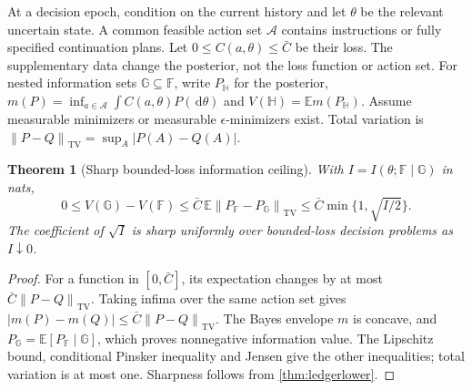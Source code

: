 \documentclass[11pt]{article}
\newcommand{\norm}[1]{\left\lVert #1\right\rVert}
\numberwithin{equation}{section}
\newtheorem{theorem}{Theorem}[section]
\theoremstyle{definition}
\theoremstyle{remark}
\newcommand{\E}{\mathbb{E}}
\theoremstyle{definition}
\newcommand{\TV}{\operatorname{TV}}
\newcommand{\dd}{\,\mathrm d}
\begin{document}
At a decision epoch, condition on the current history and let $\theta$ be
the relevant uncertain state. A common feasible action set $\mathcal A$
contains instructions or fully specified continuation plans. Let
$0\le C(a,\theta)\le\bar C$ be their loss. The supplementary data change
the posterior, not the loss function or action set. For nested information
sets $\mathbb G\subseteq\mathbb F$, write $P_{\mathbb H}$ for the posterior,
$m(P)=\inf_{a\in\mathcal A}\int C(a,\theta)P(\dd\theta)$ and
$V(\mathbb H)=\E m(P_{\mathbb H})$. Assume measurable minimizers or
measurable $\epsilon$-minimizers exist. Total variation is
$\norm{P-Q}_{\TV}=\sup_A|P(A)-Q(A)|$.

\begin{theorem}[Sharp bounded-loss information ceiling]\label{thm:ledgerupper}
With $I=I(\theta;\mathbb F\mid\mathbb G)$ in nats,
\begin{equation}\label{eq:ledgerupper}
 0\le V(\mathbb G)-V(\mathbb F)
 \le\bar C\,\E\norm{P_{\mathbb F}-P_{\mathbb G}}_{\TV}
 \le\bar C\min\{1,\sqrt{I/2}\}.
\end{equation}
The coefficient of $\sqrt I$ is sharp uniformly over bounded-loss decision
problems as $I\downarrow0$.
\end{theorem}
\begin{proof}
For a function in $[0,\bar C]$, its expectation changes by at most
$\bar C\norm{P-Q}_{\TV}$. Taking infima over the same action set gives
$|m(P)-m(Q)|\le\bar C\norm{P-Q}_{\TV}$. The Bayes envelope $m$ is concave,
and $P_{\mathbb G}=\E[P_{\mathbb F}\mid\mathbb G]$, which proves
nonnegative information value. The Lipschitz bound, conditional Pinsker
inequality and Jensen give the other inequalities; total variation is at
most one. Sharpness follows from \cref{thm:ledgerlower}.
\end{proof}
\end{document}
